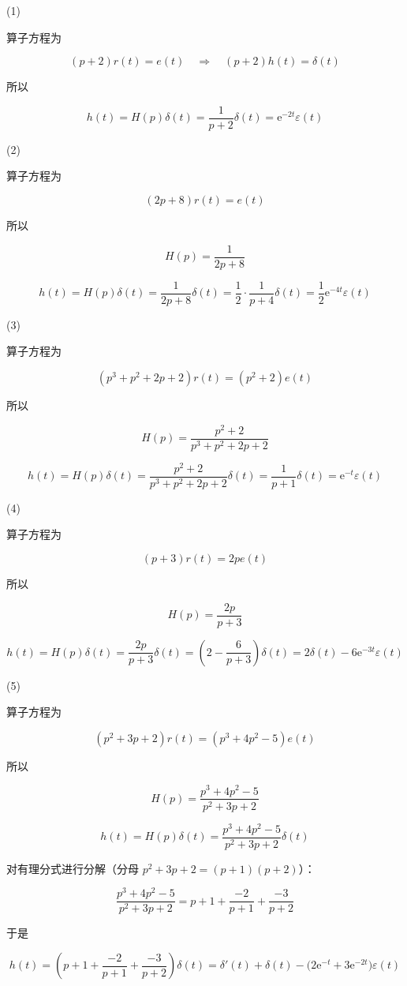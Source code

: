 \documentclass[UTF8]{ctexart}
\begin{document}
\begin{solution}
(1)

算子方程为

$$
(p+2)r(t)=e(t)\quad\Longrightarrow\quad (p+2)h(t)=\delta(t)
$$

所以

$$
h(t)=H(p)\delta(t)=\dfrac{1}{p+2}\delta(t)=\mathrm{e}^{-2t}\varepsilon(t)
$$

(2)

算子方程为

$$
(2p+8)r(t)=e(t)
$$

所以

$$
H(p)=\dfrac{1}{2p+8}
$$

$$
h(t)=H(p)\delta(t)=\dfrac{1}{2p+8}\delta(t)=\dfrac{1}{2}\cdot\dfrac{1}{p+4}\delta(t)=\dfrac{1}{2}\mathrm{e}^{-4t}\varepsilon(t)
$$

(3)

算子方程为

$$
(p^{3}+p^{2}+2p+2)r(t)=(p^{2}+2)e(t)
$$

所以

$$
H(p)=\dfrac{p^{2}+2}{p^{3}+p^{2}+2p+2}
$$

$$
h(t)=H(p)\delta(t)=\dfrac{p^{2}+2}{p^{3}+p^{2}+2p+2}\delta(t)=\dfrac{1}{p+1}\delta(t)=\mathrm{e}^{-t}\varepsilon(t)
$$

(4)

算子方程为

$$
(p+3)r(t)=2p e(t)
$$

所以

$$
H(p)=\dfrac{2p}{p+3}
$$

$$
h(t)=H(p)\delta(t)=\dfrac{2p}{p+3}\delta(t)=\left(2-\dfrac{6}{p+3}\right)\delta(t)=2\delta(t)-6\mathrm{e}^{-3t}\varepsilon(t)
$$

(5)

算子方程为

$$
(p^{2}+3p+2)r(t)=(p^{3}+4p^{2}-5)e(t)
$$

所以

$$
H(p)=\dfrac{p^{3}+4p^{2}-5}{p^{2}+3p+2}
$$

$$
h(t)=H(p)\delta(t)=\dfrac{p^{3}+4p^{2}-5}{p^{2}+3p+2}\delta(t)
$$

对有理分式进行分解（分母 $p^{2}+3p+2=(p+1)(p+2)$）：

$$
\dfrac{p^{3}+4p^{2}-5}{p^{2}+3p+2}=p+1+\dfrac{-2}{p+1}+\dfrac{-3}{p+2}
$$

于是

$$
h(t)=\left(p+1+\dfrac{-2}{p+1}+\dfrac{-3}{p+2}\right)\delta(t)=\delta'(t)+\delta(t)-\bigl(2\mathrm{e}^{-t}+3\mathrm{e}^{-2t}\bigr)\varepsilon(t)
$$
\end{solution}
\end{document}
